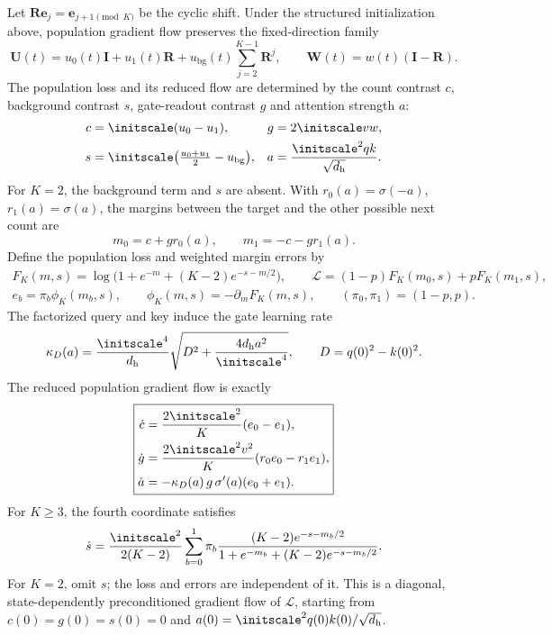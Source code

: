 \begin{proposition}
\label{prop:reduced-transition}
Let $\mathbf R\bm e_j=\bm e_{j+1\pmod K}$ be the cyclic shift. Under the structured initialization above, population gradient flow
preserves the fixed-direction family
\[
 \mathbf U(t)=u_0(t)\mathbf I+u_1(t)\mathbf R
 +u_{\mathrm{bg}}(t)\sum_{j=2}^{K-1}\mathbf R^j,\qquad
 \mathbf W(t)=w(t)(\mathbf I-\mathbf R).
\]
The population loss and its reduced flow are determined by the count contrast $c$, background contrast $s$, gate-readout contrast $g$
and attention strength $a$:
\[
 \begin{aligned}
 c&=\initscale(u_0-u_1),& g&=2\initscale vw,\\
 s&=\initscale\bigl(\tfrac{u_0+u_1}{2}-u_{\mathrm{bg}}\bigr),&
 a&=\frac{\initscale^2qk}{\sqrt{d_{\mathrm h}}}.
 \end{aligned}
\]
For $K=2$, the background term and $s$ are absent. With $r_0(a)=\sigma(-a)$, $r_1(a)=\sigma(a)$, the margins between the target
and the other possible next count are
\[
 m_0=c+g r_0(a),\qquad m_1=-c-g r_1(a).
\]
Define the population loss and weighted margin errors by
\begin{gather*}
 F_K(m,s)=\log\bigl(1+e^{-m}+(K-2)e^{-s-m/2}\bigr),\qquad
 \mathcal L=(1-p)F_K(m_0,s)+pF_K(m_1,s),\\
 e_b=\pi_b\phi_K(m_b,s),\qquad \phi_K(m,s)=-\partial_mF_K(m,s),\qquad (\pi_0,\pi_1)=(1-p,p).
\end{gather*}
The factorized query and key induce the gate learning rate
\[
 \kappa_D(a)=\frac{\initscale^4}{d_{\mathrm h}}
 \sqrt{D^2+\frac{4d_{\mathrm h}a^2}{\initscale^4}},\qquad D=q(0)^2-k(0)^2.
\]
The reduced population gradient flow is exactly
\begin{equation}
 \boxed{\begin{aligned}
 \dot c&=\frac{2\initscale^2}{K}(e_0-e_1),\\
 \dot g&=\frac{2\initscale^2v^2}{K}(r_0e_0-r_1e_1),\\
 \dot a&=-\kappa_D(a)\,g\,\sigma'(a)(e_0+e_1).
 \end{aligned}}
 \label{eq:reduced-transition}
\end{equation}
For $K\ge3$, the fourth coordinate satisfies
\[
 \dot s=\frac{\initscale^2}{2(K-2)}\sum_{b=0}^1\pi_b
 \frac{(K-2)e^{-s-m_b/2}}{1+e^{-m_b}+(K-2)e^{-s-m_b/2}}.
\]
For $K=2$, omit $s$; the loss and errors are independent of it. This is a diagonal, state-dependently preconditioned gradient flow
of $\mathcal L$, starting from $c(0)=g(0)=s(0)=0$ and $a(0)=\initscale^2q(0)k(0)/\sqrt{d_{\mathrm h}}$.
\end{proposition}

